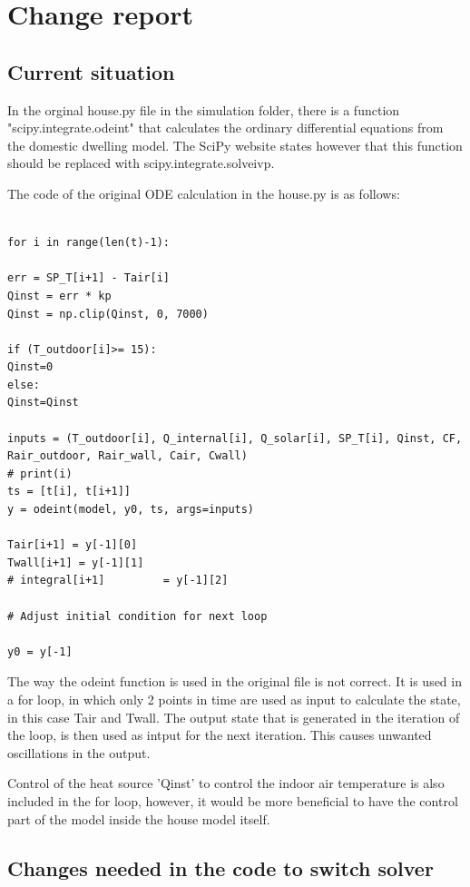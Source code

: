 \section{Change report}
\subsection{Current situation}

In the orginal house.py file in the simulation folder, there is a function "scipy.integrate.odeint"  that calculates the ordinary differential equations from the domestic dwelling model. The SciPy website states however that this function should be replaced with scipy.integrate.solveivp. 

The code of the original ODE calculation in the house.py is as follows:

\begin{lstlisting}

for i in range(len(t)-1):

err = SP_T[i+1] - Tair[i]
Qinst = err * kp
Qinst = np.clip(Qinst, 0, 7000)

if (T_outdoor[i]>= 15):
Qinst=0
else:
Qinst=Qinst

inputs = (T_outdoor[i], Q_internal[i], Q_solar[i], SP_T[i], Qinst, CF,
Rair_outdoor, Rair_wall, Cair, Cwall)
# print(i)
ts = [t[i], t[i+1]]
y = odeint(model, y0, ts, args=inputs)

Tair[i+1] = y[-1][0]
Twall[i+1] = y[-1][1]
# integral[i+1]         = y[-1][2]

# Adjust initial condition for next loop

y0 = y[-1]
\end{lstlisting}

The way the odeint function is used in the original file is not correct. It is used in a for loop, in which only 2 points in time are used as input to calculate the state, in this case Tair and Twall. The output state that is generated in the iteration of the loop, is then used as intput for the next iteration. This causes unwanted oscillations in the output.

Control of the heat source 'Qinst' to control the indoor air temperature is also included in the for loop, however, it would be more beneficial to have the control part of the model inside the house model itself.

\subsection{Changes needed in the code to switch solver}


